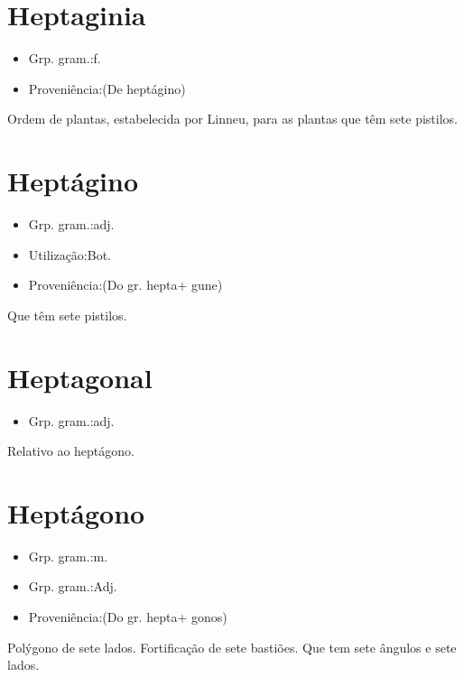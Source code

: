 \documentclass{article}
\begin{document}
\section{Heptaginia}
\begin{itemize}
\item {Grp. gram.:f.}
\end{itemize}
\begin{itemize}
\item {Proveniência:(De \textunderscore heptágino\textunderscore )}
\end{itemize}
Ordem de plantas, estabelecida por Linneu, para as plantas que têm sete pistilos.
\section{Heptágino}
\begin{itemize}
\item {Grp. gram.:adj.}
\end{itemize}
\begin{itemize}
\item {Utilização:Bot.}
\end{itemize}
\begin{itemize}
\item {Proveniência:(Do gr. \textunderscore hepta\textunderscore  + \textunderscore gune\textunderscore )}
\end{itemize}
Que têm sete pistilos.
\section{Heptagonal}
\begin{itemize}
\item {Grp. gram.:adj.}
\end{itemize}
Relativo ao heptágono.
\section{Heptágono}
\begin{itemize}
\item {Grp. gram.:m.}
\end{itemize}
\begin{itemize}
\item {Grp. gram.:Adj.}
\end{itemize}
\begin{itemize}
\item {Proveniência:(Do gr. \textunderscore hepta\textunderscore  + \textunderscore gonos\textunderscore )}
\end{itemize}
Polýgono de sete lados.
Fortificação de sete bastiões.
Que tem sete ângulos e sete lados.
\end{document}
